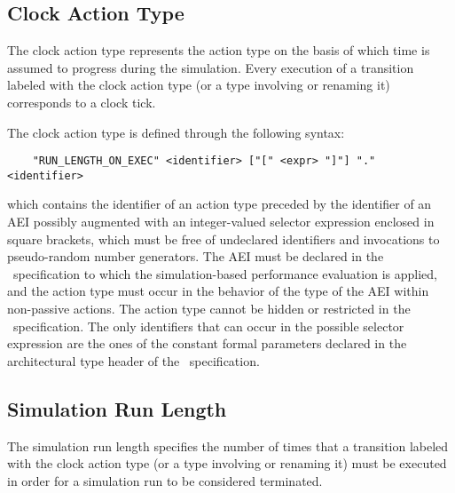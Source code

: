 \subsection{Clock Action Type}

The clock action type represents the action type on the basis of which time is assumed to progress during
the simulation. Every execution of a transition labeled with the clock action type (or a type involving or
renaming it) corresponds to a clock tick.

The clock action type is defined through the following syntax:

        \begin{verbatim}
    "RUN_LENGTH_ON_EXEC" <identifier> ["[" <expr> "]"] "." <identifier>
        \end{verbatim}

\noindent which contains the identifier of an action type preceded by the identifier of an AEI possibly
augmented with an integer-valued selector expression enclosed in square brackets, which must be free of
undeclared identifiers and invocations to pseudo-random number generators. The AEI must be declared in the
\aemilia\ specification to which the simulation-based performance evaluation is applied, and the action type
must occur in the behavior of the type of the AEI within non-passive actions. The action type cannot be
hidden or restricted in the \aemilia\ specification. The only identifiers that can occur in the possible
selector expression are the ones of the constant formal parameters declared in the architectural type header
of the \aemilia\ specification.


\subsection{Simulation Run Length}

The simulation run length specifies the number of times that a transition labeled with the clock action type
(or a type involving or renaming it) must be executed in order for a simulation run to be considered
terminated.

